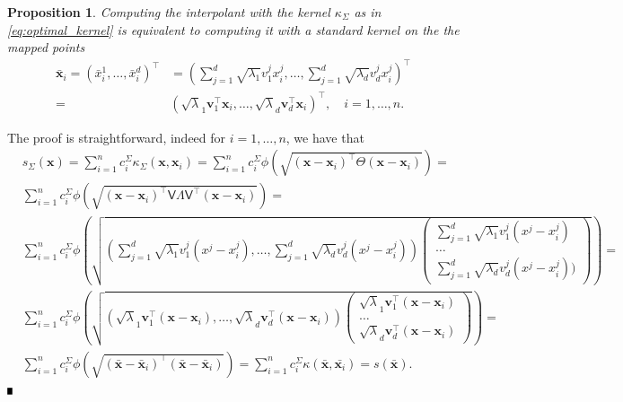 \documentclass[hyphens,a4paper,11pt]{article}
\newtheorem{proposition}[theorem]{Proposition}
\def\blackbox{\leavevmode\vrule height 5pt width 4pt depth 0pt\relax}
\newenvironment{proof}{\begin{trivlist}
\item[]\hspace{0cm}{\bf Proof:}
\hspace{0cm} }{\hfill $\blackbox$
\end{trivlist}}
\newcommand{\mV}{\mathsf{V}}
\newcommand{\mTheta}{\mathsf{\Theta}}
\newcommand{\mSigma}{\mathsf{\Sigma}}
\newcommand{\mLambda}{\mathsf{\Lambda}}
\begin{document}
\begin{proposition}
    Computing the interpolant with the kernel $\kappa_{\mSigma}$ as in \eqref{eq:optimal_kernel} is equivalent to computing it with a standard kernel on the the mapped points 
    \begin{align*}
        \bar{\boldsymbol{x}}_i = ({\bar{x}}_{i}^1, \ldots, {\bar{x}}_{i}^d)^{\intercal} & =  \left(\sum_{j=1}^d \sqrt{\lambda_1}v_1^j{{x}}_{i}^j, \ldots, \sum_{j=1}^d \sqrt{\lambda_d}v_d^j{{x}}_{i}^j\right)^{\intercal} \\  = &  \left( \sqrt{\lambda}_1{\boldsymbol{v}}_1^{\intercal} {\boldsymbol{x}}_i, \ldots, \sqrt{\lambda}_d{\boldsymbol{v}}_d^{\intercal} {\boldsymbol{x}}_i\right )^{\intercal}, \quad i= 1,\ldots,n.
    \end{align*}
\end{proposition}
\begin{proof}
The proof is straightforward, indeed for $i=1,\ldots,n$, we have that 
\begin{align*}
   & s_{\mSigma}(\boldsymbol{x}) = \sum_{i=1}^n  c_i^{\mSigma} \kappa_{\mSigma}(\boldsymbol{x},\boldsymbol{x}_i) = \sum_{i=1}^n  c_i^{\mSigma} \phi(\sqrt{(\boldsymbol{x}-\boldsymbol{x}_i)^{\intercal} \mTheta (\boldsymbol{x}-\boldsymbol{x}_i)}) = \\
   & \sum_{i=1}^n  c_i^{\mSigma} \phi(\sqrt{(\boldsymbol{x}-\boldsymbol{x}_i)^{\intercal} \mV \mLambda \mV^{\intercal} (\boldsymbol{x}-\boldsymbol{x}_i)}) = \\
    & \sum_{i=1}^n  c_i^{\mSigma} \phi\left(\sqrt{\left( \sum_{j=1}^d \sqrt{\lambda_1}v_1^j({{x}}^j-{{x}}_{i}^j), \ldots, \sum_{j=1}^d \sqrt{\lambda_d}v_d^j({{x}}^j-{{x}}_{i}^j)\right)\begin{pmatrix}
         \sum_{j=1}^d \sqrt{\lambda_1}v_1^j({{x}}^j-{{x}}_{i}^j) \\ 
         \ldots \\
         \sum_{j=1}^d \sqrt{\lambda_d}v_d^j({{x}}^j-{{x}}_{i}^j))
    \end{pmatrix} } \right) = \\
    &\sum_{i=1}^n  c_i^{\mSigma} \phi\left(\sqrt{\left( \sqrt{\lambda}_1{\boldsymbol{v}}_1^{\intercal} {(\boldsymbol{x}-\boldsymbol{x}_i)}, \ldots, \sqrt{\lambda}_d{\boldsymbol{v}}_d^{\intercal} {(\boldsymbol{x}-\boldsymbol{x}_i)}\right ) \begin{pmatrix}
    \sqrt{\lambda}_1{\boldsymbol{v}}_1^{\intercal} {(\boldsymbol{x}-\boldsymbol{x}_i)} \\ 
    \ldots \\
    \sqrt{\lambda}_d{\boldsymbol{v}}_d^{\intercal} {(\boldsymbol{x}-\boldsymbol{x}_i)}
    \end{pmatrix}} \right) =\\
     & \sum_{i=1}^n  c_i^{\mSigma} \phi(\sqrt{(\bar{\boldsymbol{x}}-\bar{\boldsymbol{x}}_i)^{\intercal} (\bar{\boldsymbol{x}}-\bar{\boldsymbol{x}}_i)}) = \sum_{i=1}^n  c_i^{\mSigma} \kappa
    (\bar{\boldsymbol{x}},\bar{\boldsymbol{x}_i}) = s(\bar{\boldsymbol{x}}).
\end{align*}
\end{proof}
\end{document}
